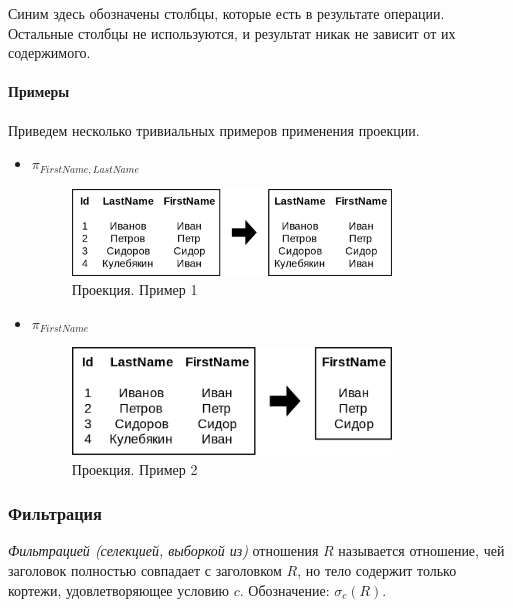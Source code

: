 Синим здесь обозначены столбцы, которые есть в результате операции. Остальные столбцы не используются, и результат никак не зависит от их содержимого.

\paragraph{Примеры}
Приведем несколько тривиальных примеров применения проекции.

\begin{itemize}
	\item $\pi_{FirstName, LastName}$
	      \begin{figure}[H]
		      \centering

		      \includegraphics[width=0.8\textwidth]{../assets/kgeorgiy/relalgebra/Primitive_Projection_2.svg.png}
		      \caption{Проекция. Пример 1}
		      \label{proj-ex-1}
	      \end{figure}
	\item $\pi_{FirstName}$
	      \begin{figure}[H]
		      \centering

		      \includegraphics[width=0.8\textwidth]{../assets/kgeorgiy/relalgebra/Primitive_Projection_3.svg.png}
		      \caption{Проекция. Пример 2}
		      \label{proj-ex-2}
	      \end{figure}
\end{itemize}

\subsubsection{Фильтрация}

\begin{definition}
	\textit{Фильтрацией (селекцией, выборкой из)} отношения $R$ называется отношение,
	чей заголовок полностью совпадает с заголовком $R$, но тело содержит только кортежи, удовлетворяющее условию $c$. Обозначение: $\sigma_c(R)$.
\end{definition}


